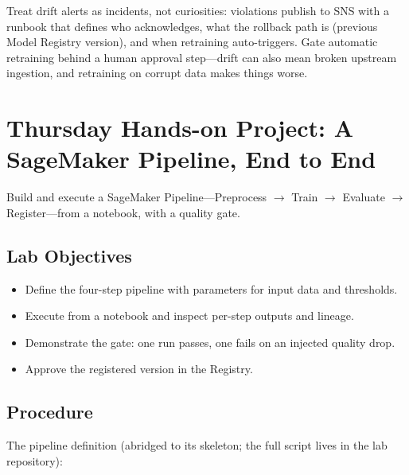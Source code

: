 \begin{tipbox}
Treat drift alerts as incidents, not curiosities: violations publish to SNS with a runbook that defines who acknowledges, what the rollback path is (previous Model Registry version), and when retraining auto-triggers. Gate automatic retraining behind a human approval step---drift can also mean broken upstream ingestion, and retraining on corrupt data makes things worse.
\end{tipbox}

\section{Thursday Hands-on Project: A SageMaker Pipeline, End to End}
Build and execute a SageMaker Pipeline---Preprocess $\rightarrow$ Train $\rightarrow$ Evaluate $\rightarrow$ Register---from a notebook, with a quality gate.

\subsection*{Lab Objectives}
\begin{itemize}
    \item Define the four-step pipeline with parameters for input data and thresholds.
    \item Execute from a notebook and inspect per-step outputs and lineage.
    \item Demonstrate the gate: one run passes, one fails on an injected quality drop.
    \item Approve the registered version in the Registry.
\end{itemize}

\subsection*{Procedure}
The pipeline definition (abridged to its skeleton; the full script lives in the lab repository):

